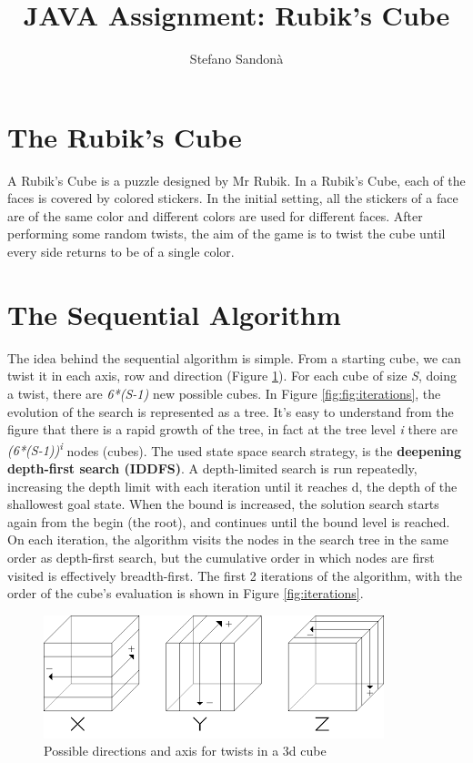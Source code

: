 \documentclass[a4paper]{article}
\begin{document}
\title{JAVA Assignment: Rubik's Cube}
\author{Stefano Sandonà}
\date{}
		
\maketitle

\section{The Rubik's Cube}
\label{sec:rubiks_cube}

A Rubik's Cube is a puzzle designed by Mr Rubik. In a Rubik's Cube, each of the faces is covered by colored stickers. In the initial setting, all the stickers of a face are of the same color and different colors are used for different faces. After performing some random twists, the aim of the game is to twist the cube until every side returns to be of a single color. 

\section{The Sequential Algorithm}
\label{sec:seq_algo}
The idea behind the sequential algorithm is simple. From a starting cube, we can twist it in each axis, row and direction (Figure \ref{fig:tw}). For each cube of size \textit{S}, doing a twist, there are \textit{6*(S-1)} new possible cubes. In Figure \ref{fig:fig:iterations}, the evolution of the search is represented as a tree. It's easy to understand from the figure that there is a rapid growth of the tree, in fact at the tree level \textit{i} there are \textit{(6*(S-1))\textsuperscript{i}} nodes (cubes).
The used state space search strategy, is the \textbf{deepening depth-first search (IDDFS)}. A depth-limited search is run repeatedly, increasing the depth limit with each iteration until it reaches d, the depth of the shallowest goal state. When the bound is increased, the solution search starts again from the begin (the root), and continues until the bound level is reached. On each iteration, the algorithm visits the nodes in the search tree in the same order as depth-first search, but the cumulative order in which nodes are first visited is effectively breadth-first. The first 2 iterations of the algorithm, with the order of the cube's evaluation is shown in Figure \ref{fig:iterations}.

\begin{figure}[ht]
  \centering
  \includegraphics[width=0.5\linewidth]{xyz}
  \caption{Possible directions and axis for twists in a 3d cube}
  \label{fig:tw}
\end{figure}
\FloatBarrier
\end{document}
